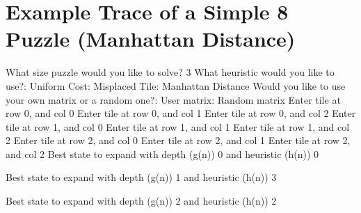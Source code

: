 \documentclass{article}
\begin{document}
\section{Example Trace of a Simple 8 Puzzle (Manhattan Distance)}
{\noindent What size puzzle would you like to solve?\newline}
3
What heuristic would you like to use?:	Uniform Cost:	Misplaced Tile:	Manhattan Distance
Would you like to use your own matrix or a random one?:	User matrix:	Random matrix
Enter tile at row 0, and col 0
Enter tile at row 0, and col 1
Enter tile at row 0, and col 2
Enter tile at row 1, and col 0
Enter tile at row 1, and col 1
Enter tile at row 1, and col 2
Enter tile at row 2, and col 0
Enter tile at row 2, and col 1
Enter tile at row 2, and col 2
{\noindent Best state to expand with depth (g(n)) 0 and heuristic (h(n)) 0\newline}
{}\newline

{\noindent Best state to expand with depth (g(n)) 1 and heuristic (h(n)) 3\newline}
{}\newline

{\noindent Best state to expand with depth (g(n)) 2 and heuristic (h(n)) 2\newline}
{}\newline
\end{document}
